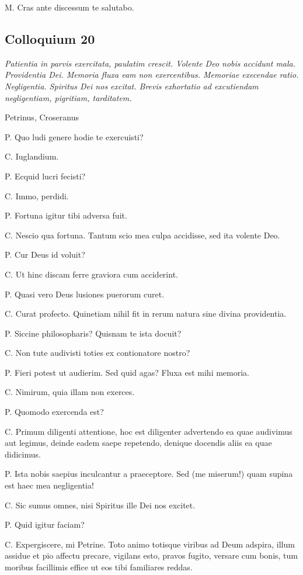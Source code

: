 \documentclass{article}
\begin{document}
M. Cras ante discessum te salutabo.

\subsection{Colloquium 20}
\emph{Patientia in parvis exercitata, paulatim crescit. Volente Deo nobis accidunt mala. Providentia Dei. Memoria fluxa eam non exercentibus. Memoriae execendae ratio. Negligentia. Spiritus Dei nos excitat. Brevis exhortatio ad excutiendam negligentiam, pigritiam, tarditatem.}

Petrinus, Croseranus

P. Quo ludi genere hodie te exercuisti?

C. Iuglandium.

P. Ecquid lucri fecisti?

C. Immo, perdidi.

P. Fortuna igitur tibi adversa fuit.

C. Nescio qua fortuna. Tantum scio mea culpa accidisse, sed ita volente Deo.

P. Cur Deus id voluit?

C. Ut hinc discam ferre graviora cum acciderint.

P. Quasi vero Deus lusiones puerorum curet.

C. Curat profecto. Quinetiam nihil fit in rerum natura sine divina providentia.

P. Siccine philosopharis? Quisnam te ista docuit?

C. Non tute audivisti toties ex contionatore nostro?

P. Fieri potest ut audierim. Sed quid agas? Fluxa est mihi memoria.

C. Nimirum, quia illam non exerces.

P. Quomodo exercenda est?

C. Primum diligenti attentione, hoc est diligenter advertendo ea quae audivimus aut legimus, deinde eadem saepe repetendo, denique docendis aliis ea quae didicimus.

P. Ista nobis saepius inculcantur a praeceptore. Sed (me miserum!) quam supina est haec mea negligentia!

C. Sic sumus omnes, nisi Spiritus ille Dei nos excitet.

P. Quid igitur faciam?

C. Expergiscere, mi Petrine. Toto animo totisque viribus ad Deum adspira, illum assidue et pio affectu precare, vigilans esto, pravos fugito, versare cum bonis, tum moribus facillimis effice ut eos tibi familiares reddas.
 
\end{document}
